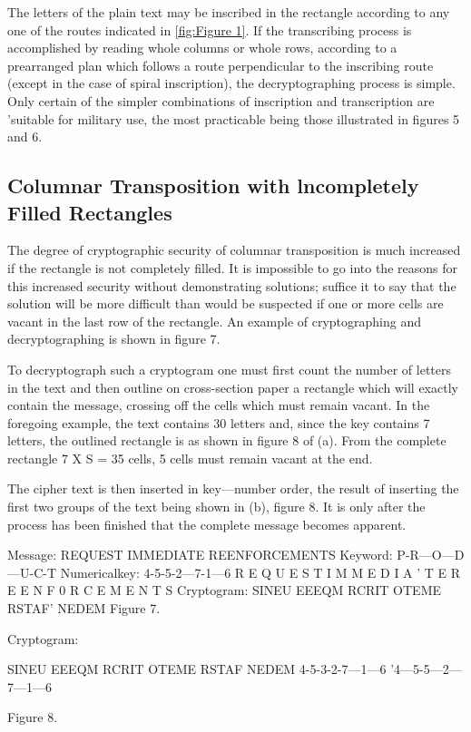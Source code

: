 \mypara The letters of the plain text may be inscribed in the rectangle
according to any one of the routes indicated in \ref{fig:Figure 1}. If the transcribing process is accomplished by reading whole columns or whole
rows, according to a prearranged plan which follows a route perpendicular to the inscribing route (except in the case of spiral inscription), the
decryptographing process is simple. Only certain of the simpler combinations of inscription and transcription are 'suitable for military use, the
most practicable being those illustrated in figures 5 and 6.

\subsection{Columnar Transposition with lncompletely Filled Rectangles}

\mypara The degree of cryptographic security of columnar transposition is
much increased if the rectangle is not completely filled. It is impossible
to go into the reasons for this increased security without demonstrating
solutions; suffice it to say that the solution will be more difficult than
would be suspected if one or more cells are vacant in the last row of the
rectangle. An example of cryptographing and decryptographing is shown
in figure 7.

\mypara To decryptograph such a cryptogram one must first count the
number of letters in the text and then outline on cross-section paper a
rectangle which will exactly contain the message, crossing off the cells
which must remain vacant. In the foregoing example, the text contains
30 letters and, since the key contains 7 letters, the outlined rectangle is as
shown in figure 8 of (a). From the complete rectangle 7 X S = 35 cells,
5 cells must remain vacant at the end.

\mypara The cipher text is then inserted in key—number order, the result of
inserting the first two groups of the text being shown in (b), figure 8.
It is only after the process has been finished that the complete message
becomes apparent.

Message:
REQUEST IMMEDIATE REENFORCEMENTS
Keyword: P-R—O—D—U-C-T
Numericalkey: 4-5-5-2—7-1—6
R E Q U E S T
I M M E D I A '
T E R E E N F
0 R C E M E N
T S
Cryptogram:
SINEU EEEQM RCRIT OTEME RSTAF' NEDEM
Figure 7.

Cryptogram:

SINEU EEEQM RCRIT OTEME RSTAF NEDEM
4-5-3-2-7—1—6 '4—5-5—2—7—1—6

Figure 8.

